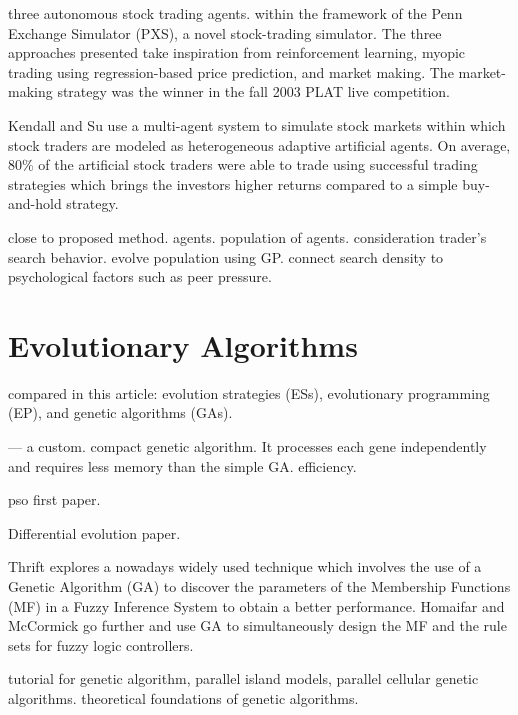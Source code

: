 \cite{Sherstov2005} three autonomous stock trading agents. within the framework
of the Penn Exchange Simulator (PXS), a novel stock-trading simulator. The three
approaches presented take inspiration from reinforcement learning, myopic
trading using regression-based price prediction, and market making. The
market-making strategy was the winner in the fall 2003 PLAT live competition.

Kendall and Su \cite{Kendall2003} use a multi-agent system to simulate stock
markets within which stock traders are modeled as heterogeneous adaptive
artificial agents. On average, 80\% of the artificial stock traders were able to
trade using successful trading strategies which brings the investors higher
returns compared to a simple buy-and-hold strategy.

\cite{Chen2001} close to proposed method. agents. population of
agents. consideration trader's search behavior. evolve population using
GP. connect search density to psychological factors such as peer pressure.

\section{Evolutionary Algorithms}
\label{section:evolutionary-algorithms}

\cite{Back2008} compared in this article: evolution strategies (ESs), evolutionary
programming (EP), and genetic algorithms (GAs).

\cite{Harik1999} — a custom. compact genetic algorithm. It processes each gene
independently and requires less memory than the simple GA. efficiency.

\cite{Eberhart2002} pso first paper.

\cite{Price1997} Differential evolution paper.

Thrift \cite{Thrift1991} explores a nowadays widely used technique which
involves the use of a Genetic Algorithm (GA) to discover the parameters of the
Membership Functions (MF) in a Fuzzy Inference System to obtain a better
performance. Homaifar and McCormick \cite{Homaifar1995} go further and use GA to
simultaneously design the MF and the rule sets for fuzzy logic controllers.

\cite{Whitley1994} tutorial for genetic algorithm, parallel island models, parallel cellular
genetic algorithms. theoretical foundations of genetic algorithms.

